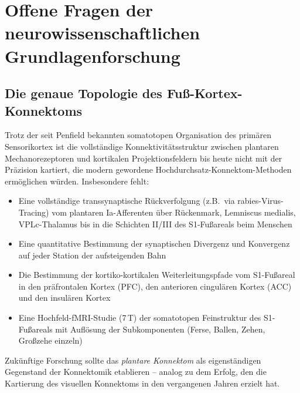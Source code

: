 ﻿\documentclass[12pt,a4paper]{report}
\theoremstyle{plain}
\theoremstyle{definition}
\theoremstyle{remark}
\begin{document}
\section{Offene Fragen der neurowissenschaftlichen Grundlagenforschung}

\subsection{Die genaue Topologie des Fuß-Kortex-Konnektoms}

Trotz der seit Penfield bekannten somatotopen Organisation des primären
Sensorikortex ist die vollständige Konnektivitätsstruktur zwischen
plantaren Mechanore\-zeptoren und kortikalen Projektionsfeldern bis heute
nicht mit der Präzision kartiert, die modern gewordene
Hochdurchsatz-Konnektom-Methoden ermöglichen würden. Insbesondere fehlt:

\begin{itemize}
\item Eine vollständige transsynaptische Rückverfolgung (z.B.\ via
  rabies-Virus-Tracing) vom plantaren Ia-Afferenten über Rückenmark,
  Lemniscus medialis, VPLc-Thalamus bis in die Schichten II/III des
  S1-Fußareals beim Menschen
\item Eine quantitative Bestimmung der synaptischen Divergenz und
  Konvergenz auf jeder Station der aufsteigenden Bahn
\item Die Bestimmung der kortiko-kortikalen Weiterleitungspfade vom
  S1-Fußareal in den präfrontalen Kortex (PFC), den anterioren
  cingulären Kortex (ACC) und den insulären Kortex
\item Eine Hochfeld-fMRI-Studie (7\,T) der somatotopen
  Feinstruktur des S1-Fußareals mit Auflösung der Subkomponenten
  (Ferse, Ballen, Zehen, Großzehe einzeln)
\end{itemize}

Zukünftige Forschung sollte das \emph{plantare Konnektom} als eigenständigen
Gegenstand der Konnektomik etablieren -- analog zu dem Erfolg, den die
Kartierung des visuellen Konnektoms in den vergangenen Jahren erzielt hat.
\end{document}
